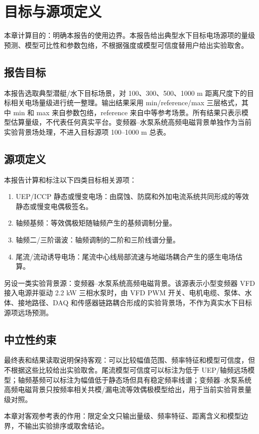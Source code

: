 \section{目标与源项定义}

本章计算目的：明确本报告的使用边界。本报告给出典型水下目标电场源项的量级预测、模型可比性和参数包络，不根据强度或模型可信度替用户给出实验取舍。

\subsection{报告目标}

本报告选取典型潜艇/水下目标场景，对 100、300、500、1000 m 距离尺度下的目标相关电场量级进行统一整理。输出结果采用 min/reference/max 三层格式，其中 min 和 max 来自参数包络，reference 来自中等参考场景。所有结果只表示模型估算量级，不代表任何真实平台。变频器--水泵系统高频电磁背景单独作为当前实验背景场处理，不进入目标源项 100--1000 m 总表。

\subsection{源项定义}

本报告计算和标注以下四类目标相关源项：

\begin{enumerate}
  \item UEP/ICCP 静态或慢变电场：由腐蚀、防腐和外加电流系统共同形成的等效静态或慢变电偶极签名。
  \item 轴频基频：等效偶极矩随轴频产生的基频调制分量。
  \item 轴频二/三阶谐波：轴频调制的二阶和三阶线谱分量。
  \item 尾流/流动诱导电场：尾流中心线局部流速与地磁场耦合产生的感生电场估算。
\end{enumerate}

另设一类实验背景源：变频器--水泵系统高频电磁背景。该源表示小型变频器 VFD 接入电源并驱动 2.2 kW 三相水泵时，由 VFD PWM 开关、电机电缆、泵体、水体、接地路径、DAQ 和传感器链路耦合形成的实验背景场，不作为真实水下目标源项远场预测。

\subsection{中立性约束}

最终表和结果读取说明保持客观：可以比较幅值范围、频率特征和模型可信度，但不根据这些比较给出实验取舍。尾流模型可信度可以标注为低于 UEP/轴频远场模型；轴频基频可以标注为幅值低于静态场但具有稳定频率线谱；变频器--水泵系统高频电磁背景只按频率相关共模/漏电流等效偶极模型给出，用于当前实验背景量级对照。

本章对客观参考表的作用：限定全文只输出量级、频率特征、距离含义和模型边界，不输出实验排序或取舍结论。
